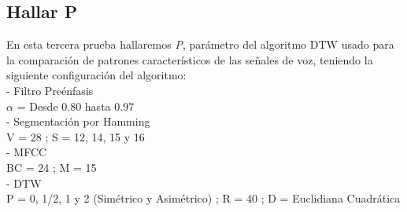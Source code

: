 \subsection{Hallar P}
En esta tercera prueba hallaremos \textit{P}, parámetro del algoritmo DTW usado para la comparación de patrones característicos de las señales de voz, teniendo la siguiente configuración del algoritmo: \\
- Filtro Preénfasis \\
\hspace*{1cm} $\alpha$ = Desde 0.80 hasta 0.97 \\
- Segmentación por Hamming \\
\hspace*{1cm} V = 28 ; \qquad S = 12, 14, 15 y 16 \\
- MFCC \\
\hspace*{1cm} BC = 24 ; \qquad M = 15 \\
- DTW \\
\hspace*{1cm} P = 0, 1/2, 1 y 2 (Simétrico y Asimétrico) ; \qquad R = 40 ; \qquad D = Euclidiana Cuadrática
\vskip -0.5cm
